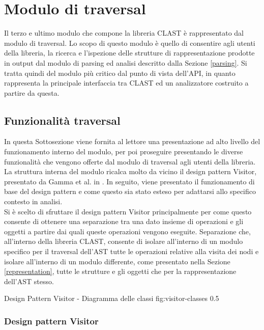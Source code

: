 \section{Modulo di traversal}

Il terzo e ultimo modulo che compone la libreria CLAST è rappresentato dal
modulo di traversal. Lo scopo di questo modulo è quello di consentire agli
utenti della libreria, la ricerca e l'ispezione delle strutture di
rappresentazione prodotte in output dal modulo di parsing ed analisi descritto
dalla Sezione \ref{parsing}. Si tratta quindi del modulo più critico dal punto
di vista dell'API, in quanto rappresenta la principale interfaccia tra CLAST ed
un analizzatore costruito a partire da questa.

\subsection{Funzionalità traversal}

In questa Sottosezione viene fornita al lettore una presentazione ad alto
livello del funzionamento interno del modulo, per poi proseguire presentando le
diverse funzionalità che vengono offerte dal modulo di traversal agli utenti
della libreria.\\

La struttura interna del modulo ricalca molto da vicino il design pattern
Visitor, presentato da Gamma et al. in \cite{gamma1995design}. In seguito, viene
presentato il funzionamento di base del design pattern e come questo sia stato
esteso per adattarsi allo specifico contesto in analisi.\\

Si è scelto di sfruttare il design pattern Visitor principalmente per come
questo consente di ottenere una separazione tra una dato insieme di operazioni e
gli oggetti a partire dai quali queste operazioni vengono eseguite. Separazione
che, all'interno della libreria CLAST, consente di isolare all'interno di un
modulo specifico per il traversal dell'AST tutte le operazioni relative alla
visita dei nodi e isolare all'interno di un modulo differente, come presentato
nella Sezione \ref{representation}, tutte le strutture e gli oggetti che per la
rappresentazione dell'AST stesso.

      {Design Pattern Visitor - Diagramma delle classi}
      {fig:visitor-classes}
      {0.5}

\subsubsection{Design pattern Visitor}

